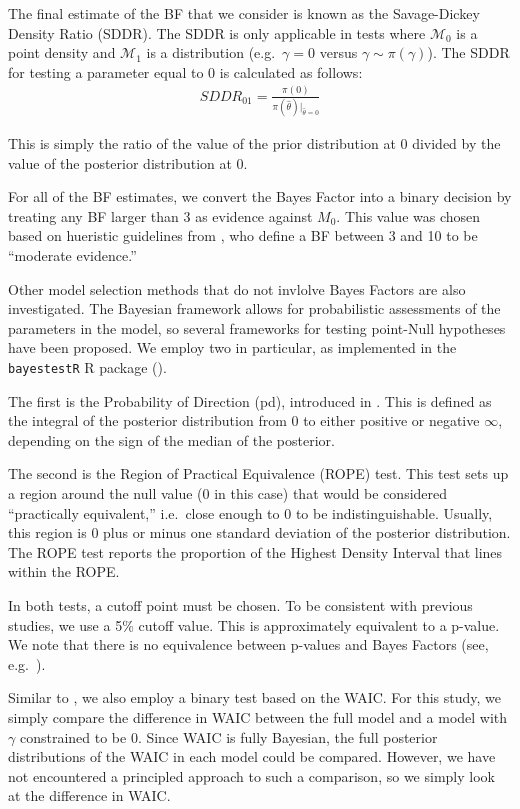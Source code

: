 \documentclass[10pt,letterpaper]{article}
\begin{document}
The final estimate of the BF that we consider is known as the
Savage-Dickey Density Ratio (SDDR). The SDDR is only applicable in tests
where \(\mathcal M_0\) is a point density and \(\mathcal M_1\) is a
distribution (e.g.~\(\gamma = 0\) versus \(\gamma \sim \pi(\gamma)\)).
The SDDR for testing a parameter equal to 0 is calculated as follows:
\begin{align}
SDDR_{01} = \frac{\pi(0)}{\pi(\hat\theta)|_{\hat\theta = 0}}
\end{align}

This is simply the ratio of the value of the prior distribution at 0
divided by the value of the posterior distribution at 0.

For all of the BF estimates, we convert the Bayes Factor into a binary decision by treating any BF larger than 3 as evidence against $M_0$. This value was chosen based on
hueristic guidelines from \cite{jeffreysTheoryProbability1998}, who
define a BF between 3 and 10 to be ``moderate evidence.''

Other model selection methods that do not invlolve Bayes Factors are
also investigated. The Bayesian framework allows for probabilistic
assessments of the parameters in the model, so several frameworks for
testing point-Null hypotheses have been proposed. We employ two in
particular, as implemented in the \texttt{bayestestR} R package
(\cite{makowskiUnderstandDescribeBayesian2019}).

The first is the Probability of Direction (pd), introduced in
\cite{makowskiIndicesEffectExistence2019}. This is defined as the
integral of the posterior distribution from 0 to either positive or
negative \(\infty\), depending on the sign of the median of the
posterior.

The second is the Region of Practical Equivalence (ROPE) test. This test
sets up a region around the null value (0 in this case) that would be
considered ``practically equivalent,'' i.e.~close enough to 0 to be
indistinguishable. Usually, this region is \(0\) plus or minus one standard
deviation of the posterior distribution. The ROPE test reports the
proportion of the Highest Density Interval that lines within the ROPE.

In both tests, a cutoff point must be chosen. To be consistent with
previous studies, we use a 5\% cutoff value. This is approximately
equivalent to a p-value. We note that there is no equivalence between
p-values and Bayes Factors (see,
e.g.~\cite{lindleyStatisticalParadox1957}).

Similar to \cite{luoPerformancesLOOWAIC2017}, we also employ a binary
test based on the WAIC. For this study, we simply compare the difference
in WAIC between the full model and a model with \(\gamma\) constrained
to be 0. Since WAIC is fully Bayesian, the full posterior distributions
of the WAIC in each model could be compared. However, we have not
encountered a principled approach to such a comparison, so we simply
look at the difference in WAIC.
\end{document}
